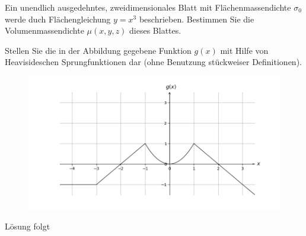 \documentclass{atistandalonetask}
\begin{document}
  \begin{atiTask}[
    title = Heaviside-Funktion und Delta-Distribution
  ]
\begin{atiSubtasks}
\item Ein unendlich ausgedehntes, zweidimensionales Blatt mit Flächenmassendichte $\sigma_0$ werde duch Flächengleichung $y=x^3$ beschrieben. Bestimmen Sie die Volumenmassendichte $\mu(x,y,z)$ dieses Blattes. 

\item Stellen Sie die in der Abbildung gegebene Funktion $g(x)$ mit Hilfe von Heavisideschen Sprungfunktionen dar (ohne Benutzung stückweiser Definitionen).  
  \begin{figure}[H]
\centering
\includegraphics[width=0.8\linewidth]{./picture-heaviside_iib}

\end{figure}
\end{atiSubtasks}
  	
  \end{atiTask}
  \begin{atiSolution}
   	Lösung folgt
  \end{atiSolution}
\end{document}
